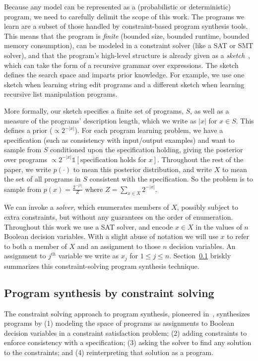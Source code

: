 \documentclass{article}
\begin{document}
Because any model can be represented as a (probabilistic or deterministic) program,
we need to carefully delimit
the scope of this work.
The programs we learn are a subset of those handled by constraint-based program synthesis tools.
This means that the program is \emph{finite} (bounded size, bounded runtime, bounded memory consumption),
can be modeled in a constraint solver (like a SAT or SMT solver),
and that the program's high-level structure is already given as a \emph{sketch}~\cite{solar2008program},
which can take the form of a recursive grammar over expressions.
The sketch defines the search space and imparts prior knowledge.
For example,
we use one sketch when learning string edit programs and a different sketch when learning recursive list manipulation programs.

More formally, our sketch specifies a finite set of programs, $S$,
as well as a measure of the programs' description length,
which we write as $\lvert x \rvert$ for $x\in S$.
This defines a prior ($\propto 2^{- \lvert x \rvert }$).
For each program learning problem,
we have a specification (such as consistency with input/output examples)
and want to sample from $S$ conditioned upon the specification holding,
giving the posterior over programs $\propto 2^{- \lvert x \rvert } \mathds{1}[\text{specification holds for }x]$.
Throughout the rest of the paper, we write $p(\cdot )$ to mean this posterior distribution, and write $X$ to mean the set of all  programs in $S$  consistent with the specification.
So the problem is to sample from  $p(x) = \frac{2^{-|x|}}{Z}$  where $Z = \sum_{x\in X} 2^{-|x|}$.

We can invoke a \emph{solver}, which enumerates members of $X$,
possibly subject to extra constraints, but without any guarantees on
the order of enumeration.  Throughout this work we use a SAT solver,
and encode $x\in X$ in the values of $n$ Boolean decision variables.
With a slight abuse of notation we will use $x$ to refer to both a
member of $X$ and an assignment to those $n$ decision variables.  An
assignment to $j^{th}$ variable we write as $x_j$ for $1\leq j\leq n$.
Section~\ref{brisk} briskly summarizes this constraint-solving program synthesis technique.

\subsection{Program synthesis by constraint solving}\label{brisk}
The constraint solving approach to program synthesis, pioneered
in~\cite{solar2008program,srivastava2010program,jha2010oracle},
synthesizes programs by (1) modeling the space of programs as
assignments to Boolean decision variables in a constraint satisfaction
problem; (2) adding constraints to enforce consistency with a
specification; (3) asking the solver to find any solution to the
constraints; and (4) reinterpreting that solution as a program.
\end{document}
